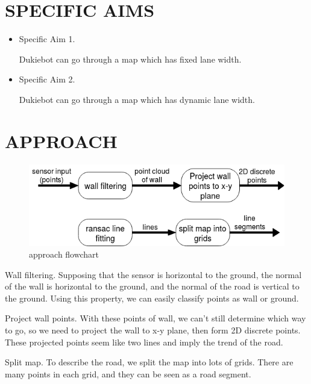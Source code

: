 \documentclass[letterpaper, 10 pt, conference]{ieeeconf}  %
\begin{document}
\section{SPECIFIC AIMS}


\begin{itemize}
\item Specific Aim 1.

Dukiebot can go through a map which has fixed lane width.
\item Specific Aim 2.

Dukiebot can go through a map which has dynamic lane width.
\end{itemize}

\section{APPROACH}


\begin{figure}[h] %
\includegraphics[width=1.0\columnwidth]{approach1.png}
\centering
\caption{approach flowchart}
\end{figure}
Wall filtering. Supposing that the sensor is horizontal to the ground, the normal of the wall is horizontal to the ground, and the normal of the road is vertical to the ground. Using this property, we can easily classify points as wall or ground.

Project wall points. With these points of wall, we can't still determine which way to go, so we need to project the wall to x-y plane, then form 2D discrete points. These projected points seem like two lines and imply the trend of the road.  

Split map. To describe the road, we split the map into lots of grids. There are many points in each grid, and they can be seen as a road segment.
\end{document}
